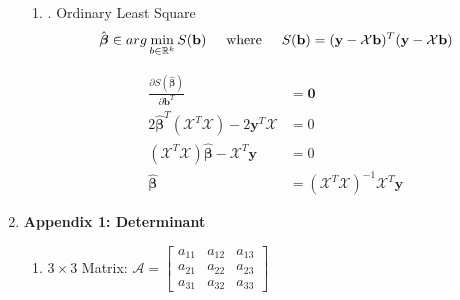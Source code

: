 \documentclass[12pt]{article}
\begin{document}
\begin{enumerate}
\begin{enumerate}
	\item\underline{}. Ordinary Least Square
	\[ \hat{\boldsymbol{\beta}} \in arg \min_{b \in \mathbb{R}^k} S(\mathbf{b}) \hspace{5mm} \text{where} \hspace{5mm} S(\mathbf{b}) = (\mathbf{y}-\mathcal{X}\mathbf{b})^T (\mathbf{y}-\mathcal{X}\mathbf{b}) \]
	
	\begin{align*}
		\frac{\partial S(\hat{\boldsymbol{\beta}})}{\partial \mathbf{b}^T} &= \mathbf{0} \\[5pt]
		2\hat{\boldsymbol{\beta}}^T (\mathcal{X}^T \mathcal{X}) - 2 \mathbf{y}^T \mathcal{X} &= 0 \\[5pt]
		(\mathcal{X}^T \mathcal{X}) \hat{\boldsymbol{\beta}} - \mathcal{X}^T \mathbf{y} &= 0 \\[5pt]
		\hat{\boldsymbol{\beta}} &= (\mathcal{X}^T \mathcal{X})^{-1} \mathcal{X}^T \mathbf{y} 
	\end{align*}
	
	\end{enumerate}

\newpage

\item\textbf{Appendix 1: Determinant}
	\begin{enumerate}
		\item $3 \times 3$ Matrix: $\mathcal{A}=\begin{bmatrix}
		a_{11} & a_{12} & a_{13} \\
		a_{21} & a_{22} & a_{23} \\
		a_{31} & a_{32} & a_{33}
		\end{bmatrix}$\\
		

\end{enumerate}
\end{enumerate}
\end{document}
